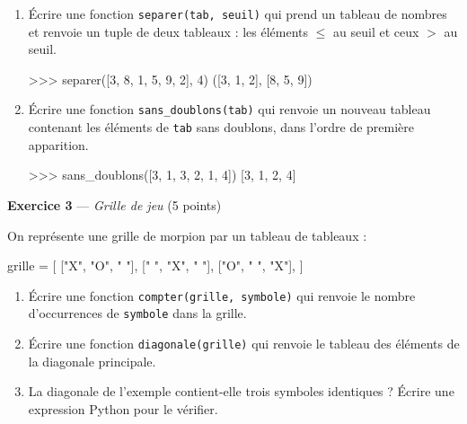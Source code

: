 \begin{enumerate}
  \item Écrire une fonction \lstinline{separer(tab, seuil)} qui prend un
        tableau de nombres et renvoie un tuple de deux tableaux :
        les éléments $\leq$ au seuil et ceux $>$ au seuil.
\begin{console}
>>> separer([3, 8, 1, 5, 9, 2], 4)
([3, 1, 2], [8, 5, 9])
\end{console}
  \item Écrire une fonction \lstinline{sans_doublons(tab)} qui renvoie un
        nouveau tableau contenant les éléments de \lstinline{tab} sans
        doublons, dans l'ordre de première apparition.
\begin{console}
>>> sans_doublons([3, 1, 3, 2, 1, 4])
[3, 1, 2, 4]
\end{console}
\end{enumerate}


\bigskip

\textbf{Exercice 3} --- \textit{Grille de jeu} \hfill (5 points)

On représente une grille de morpion par un tableau de tableaux :
\begin{python}
grille = [
    ["X", "O", " "],
    [" ", "X", " "],
    ["O", " ", "X"],
]
\end{python}

\begin{enumerate}
  \item Écrire une fonction \lstinline{compter(grille, symbole)} qui renvoie
        le nombre d'occurrences de \lstinline{symbole} dans la grille.
  \item Écrire une fonction \lstinline{diagonale(grille)} qui renvoie le
        tableau des éléments de la diagonale principale.
  \item La diagonale de l'exemple contient-elle trois symboles identiques ?
        Écrire une expression Python pour le vérifier.
\end{enumerate}


